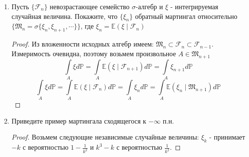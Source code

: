 \documentclass[12pt,a4paper]{article} %
\newcommand{\E}{\mathbb{E}}
\newcommand{\PR}{\mathbb{P}}
\newcommand{\F}{\mathcal{F}}
\newcommand{\M}{\mathfrak{M}}
\begin{document}
\begin{enumerate}
		\begin{proof}
			Во-первых перейдем к неотрицательному субмартингалу $\eta_n=|\xi_n|$ и определим ограниченный момент остановки $\tau_n=\min(\tau,n)$. Тогда доказательство завершается следующим предельным переходом:
			$$\E|\xi_{\tau}|=\lim\limits_{m\rightarrow+\infty}\E\eta_{\tau_m}\leq\lim\limits_m\lim\limits_n\E|\xi_n|=\lim\limits_n\E|\xi_n|$$
		\end{proof}
		\item Пусть $\{\F_n\}$ невозрастающее семейство $\sigma$-алгебр и $\xi$ - интегрируемая случайная величина. Покажите, что $\{\xi_n\}$ обратный мартингал относительно $\{\M_n=\sigma\{\xi_n,\xi_{n+1},\cdots\}\}$, где $\xi_n=\E(\xi\mid\F_n)$
		\begin{proof}
			Из вложенности исходных алгебр имеем: $\M_n\subset\F_n\subset\F_{n-1}$. Измеримость очевидна, поэтому возьмем произвольное $A\in\M_{n+1}$
			$$\int\limits_A\xi d\PR=\int\limits_A\E(\xi\mid\F_{n+1})d\PR=\int\limits_A\xi_{n+1}d\PR$$
			$$\int\limits_A\xi d\PR=\int\limits_A\E(\xi\mid\F_n)d\PR=\int\limits_A\xi_nd\PR=\int\limits_A\E(\xi_n\mid\M_{n+1})d\PR$$
		\end{proof}
		\item Приведите пример мартингала сходящегося к $-\infty$ п.н.
		\begin{proof}
			Возьмем следующие независимые случайные величины: $\xi_k$ - принимает $-k$ с вероятностью $1-\frac{1}{k^2}$ и $k^3-k$ с вероятностью $\frac{1}{k^2}$.
			

\end{proof}
\end{enumerate}
\end{document}
